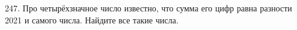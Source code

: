 247. Про четырёхзначное число известно, что сумма его цифр равна разности 2021 и самого числа. Найдите все такие числа.\\
